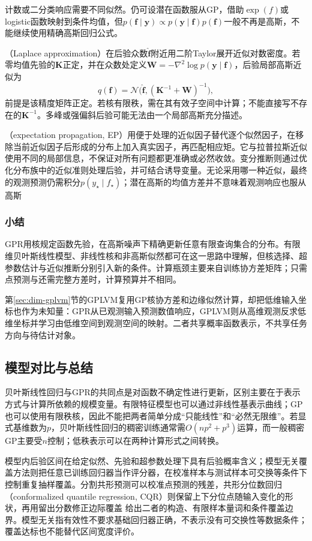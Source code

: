计数或二分类响应需要不同似然。仍可设潜在函数服从GP，借助$\exp(f)$或logistic函数映射到条件均值，但$p(\bm{f}\mid\bm{y})\propto p(\bm{y}\mid\bm{f})p(\bm{f})$一般不再是高斯，不能继续使用精确高斯回归公式。

（Laplace approximation）在后验众数$\widehat{\bm{f}}$附近用二阶Taylor展开近似对数密度。若零均值先验的$\bm{K}$正定，并在众数处定义$\bm{W}=-\nabla^2\log p(\bm{y}\mid\bm{f})$，后验局部高斯近似为
\[
  q(\bm{f})=\mathcal{N}\bigl(
       \widehat{\bm{f}},(\bm{K}^{-1}+\bm{W})^{-1}\bigr),
\]
前提是该精度矩阵正定。若核有限秩，需在其有效子空间中计算；不能直接写不存在的$\bm{K}^{-1}$。多峰或强偏斜后验可能无法由一个局部高斯充分描述。

（expectation propagation, EP）用便于处理的近似因子替代逐个似然因子，在移除当前近似因子后形成的分布上加入真实因子，再匹配相应矩。它与拉普拉斯近似使用不同的局部信息，不保证对所有问题都更准确或必然收敛。变分推断则通过优化分布族中的近似准则处理后验，并可结合诱导变量。无论采用哪一种近似，最终的观测预测仍需积分$p(y_{\star}\mid f_{\star})$；潜在高斯的均值方差并不意味着观测响应也服从高斯

\subsubsection{小结}

GPR用核规定函数先验，在高斯噪声下精确更新任意有限查询集合的分布。有限维贝叶斯线性模型、非线性核和非高斯似然都可在这一思路中理解，但核选择、超参数估计与近似推断分别引入新的条件。计算瓶颈主要来自训练协方差矩阵；只需点预测与还需完整方差时，计算预算并不相同。

第\ref{sec:dim-gplvm}节的GPLVM复用GP核协方差和边缘似然计算，却把低维输入坐标也作为未知量：GPR从已观测输入预测数值响应，GPLVM则从高维观测反求低维坐标并学习由低维空间到观测空间的映射。二者共享概率函数表示，不共享任务方向与待估计对象。

\subsection{模型对比与总结}

贝叶斯线性回归与GPR的共同点是对函数不确定性进行更新，区别主要在于表示方式与计算所依赖的规模变量。有限特征模型也可以通过非线性基表示曲线；GP也可以使用有限秩核，因此不能把两者简单分成“只能线性”和“必然无限维”。若显式基维数为$p$，贝叶斯线性回归的稠密训练通常需$O(np^2+p^3)$运算，而一般稠密GP主要受$n$控制；低秩表示可以在两种计算形式之间转换。

模型内后验区间在给定似然、先验和超参数处理下具有后验概率含义；模型无关覆盖方法则把任意已训练回归器当作评分器，在校准样本与测试样本可交换等条件下控制重复抽样覆盖。分割共形预测可以校准点预测的残差，共形分位数回归（conformalized quantile regression, CQR）则保留上下分位点随输入变化的形状，再用留出分数修正边际覆盖
给出二者的构造、有限样本量词和条件覆盖边界。模型无关指有效性不要求基础回归器正确，不表示没有可交换性等数据条件；覆盖达标也不能替代区间宽度评价。

